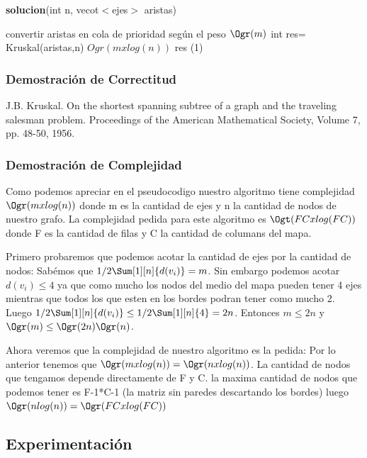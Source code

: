 \documentclass[spanish,12pt]{article}
\begin{document}
\begin{algorithm}[H]{\textbf{solucion}(int n, vecot$<$ejes$>$ aristas)}
	\begin{algorithmic}[1]
		\State convertir aristas en cola de prioridad según el peso \Comment $\Ogr(m)$
		\State int res= Kruskal(aristas,n)  \Comment $Ogr(mxlog(n))$
		\devolver res \Comment \Ogr(1)
	\end{algorithmic}
\end{algorithm}

\subsubsection{Demostración de Correctitud}


J.B. Kruskal. On the shortest spanning subtree of a graph and the traveling salesman problem. Proceedings of the American Mathematical Society, Volume 7, pp. 48-50, 1956.


\subsubsection{Demostración de Complejidad}

Como podemos apreciar en el pseudocodigo nuestro algoritmo tiene complejidad $\Ogr(mxlog(n))$ donde m es la cantidad de ejes y n la cantidad de nodos de nuestro grafo. 
La complejidad pedida para este algoritmo es $\Ogt(FCxlog(FC))$ donde F es la cantidad de filas y C la cantidad de columans del mapa.

Primero probaremos que podemos acotar la cantidad de ejes por la cantidad de nodos:
Sabémos que $1/2  \Sum[1][n]{d(v_{i})} =m $. Sin embargo podemos acotar $d(v_{i}) \leq 4$ ya que como mucho los nodos del medio del mapa pueden tener 4 ejes mientras que todos los que esten en los bordes podran tener como mucho 2. Luego $1/2  \Sum[1][n]{d(v_{i})} \leq 1/2 \Sum[1][n]{4} = 2n$. Entonces $m \leq 2n$ y $\Ogr(m) \leq \Ogr(2n) \Ogr(n)$.

Ahora veremos que la complejidad de nuestro algoritmo es la pedida:
Por lo anterior tenemos que $\Ogr(mxlog(n))= \Ogr(nxlog(n))$.
La cantidad de nodos que tengamos depende directamente de F y C. la maxima cantidad de nodos que podemos tener es F-1*C-1 (la matriz sin paredes descartando los bordes) luego $\Ogr(nlog(n)) = \Ogr(FCxlog(FC))$ 


\subsection{Experimentación}
\end{document}
